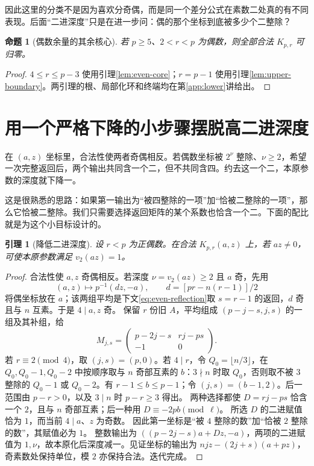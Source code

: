 \documentclass[11pt,a4paper,oneside,openany]{book}
\newtheorem{lemma}[theorem]{引理}
\newtheorem{proposition}[theorem]{命题}
\theoremstyle{definition}
\numberwithin{equation}{chapter}
\begin{document}
因此这里的分类不是因为喜欢分奇偶，而是同一个差分公式在素数二处真的有不同表现。后面“二进深度”只是在进一步问：偶的那个坐标到底被多少个二整除？
\begin{proposition}[偶数余量的其余核心]\label{prop:even}
若 $p\ge5$、$2<r<p$ 为偶数，则全部合法 $K_{p,r}$ 可归零。
\end{proposition}
\begin{proof}
$4\le r\le p-3$ 使用引理\ref{lem:even-core}；$r=p-1$ 使用引理\ref{lem:upper-boundary}。两引理的根、局部化环和终端均在第\ref{app:lower}讲给出。
\end{proof}

\section{用一个严格下降的小步骤摆脱高二进深度}
在 $(a,z)$ 坐标里，合法性使两者奇偶相反。若偶数坐标被 $2^\nu$ 整除、$\nu\ge2$，希望一次完整返回后，两个输出共同含一个二，但不共同含四。约去这一个二，本原参数的深度就下降一。

这是很熟悉的思路：如果第一输出为“被四整除的一项”加“恰被二整除的一项”，那么它恰被二整除。我们只需要选择返回矩阵的某个系数也恰含一个二。下面的配比就是为这个小目标设计的。
\begin{lemma}[降低二进深度]\label{lem:binary-depth}
设 $r<p$ 为正偶数。在合法 $K_{p,r}(a,z)$ 上，若 $az\ne0$，可使本原参数满足 $v_2(az)=1$。
\end{lemma}
\begin{proof}
合法性使 $a,z$ 奇偶相反。若深度 $\nu=v_2(az)\ge2$ 且 $a$ 奇，先用
\[
(a,z)\mapsto p^{-1}(dz,-a),\qquad d=[pr-n(r-1)]/2
\]
将偶坐标放在 $a$；该两组平均是下文\eqref{eq:even-reflection}取 $s=r-1$ 的返回，$d$ 奇且与 $n$ 互素。于是 $4\mid a,z$ 奇。
保留 $r$ 份旧 $A$，平均组成 $(p-j-s,j,s)$ 的一组及其补组，给
\[
M_{j,s}=\begin{pmatrix}p-2j-s&rj-ps\\-1&0\end{pmatrix}.
\]
若 $r\equiv2\pmod4$，取 $(j,s)=(p,0)$。若 $4\mid r$，令 $Q_0=\lfloor n/3\rfloor$，在 $Q_0,Q_0-1,Q_0-2$ 中按顺序取与 $n$ 奇部互素的 $b$：$3\nmid n$ 时取 $Q_0$，否则取不被 $3$ 整除的 $Q_0-1$ 或 $Q_0-2$。有 $r-1\le b\le p-1$；令 $(j,s)=(b-1,2)$。后一范围由 $p-r>0$，以及 $3\mid n$ 时 $p-r\ge3$ 得出。
两种选择都使 $D=rj-ps$ 恰含一个 $2$，且与 $n$ 奇部互素；后一种用 $D\equiv-2pb\pmod\ell$。
所选 $D$ 的二进赋值恰为 $1$，而当前 $4\mid a$、$z$ 为奇数。
因此第一坐标是“被 $4$ 整除的数”加“恰被 $2$ 整除的数”，其赋值必为 $1$。
整数输出为 $((p-2j-s)a+Dz,-a)$，两项的二进赋值为 $1,\nu$，故本原化后深度减一。见证坐标的输出为 $njz-(2j+s)(a+pz)$，奇素数处保持单位，模 $2$ 亦保持合法。迭代完成。
\end{proof}
\end{document}
